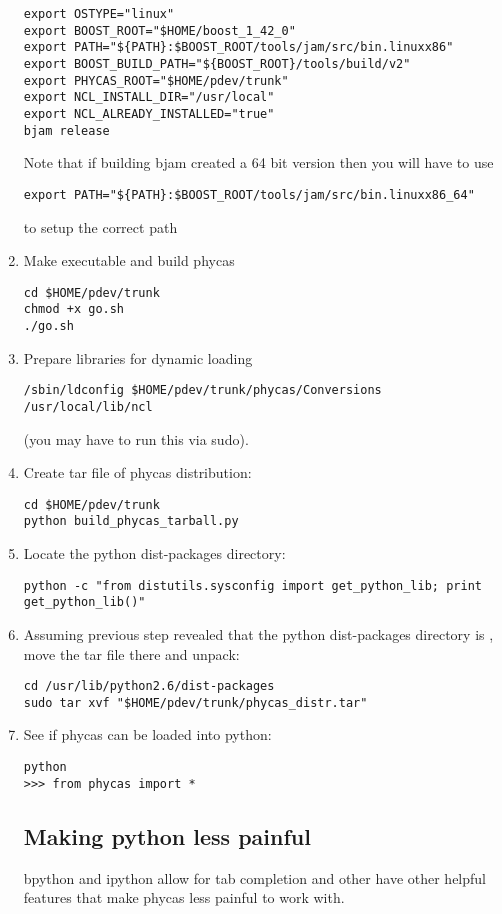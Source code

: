 \begin{enumerate}
\begin{verbatim}
export OSTYPE="linux"
export BOOST_ROOT="$HOME/boost_1_42_0"
export PATH="${PATH}:$BOOST_ROOT/tools/jam/src/bin.linuxx86"
export BOOST_BUILD_PATH="${BOOST_ROOT}/tools/build/v2"
export PHYCAS_ROOT="$HOME/pdev/trunk"
export NCL_INSTALL_DIR="/usr/local"
export NCL_ALREADY_INSTALLED="true"
bjam release
\end{verbatim}

Note that if building bjam created a 64 bit version then you will have to use
\begin{verbatim}
export PATH="${PATH}:$BOOST_ROOT/tools/jam/src/bin.linuxx86_64"
\end{verbatim}
to setup the correct path


%
\item Make  executable and build phycas
\begin{verbatim}
cd $HOME/pdev/trunk
chmod +x go.sh
./go.sh
\end{verbatim}
%
\item Prepare libraries for dynamic loading
\begin{verbatim}
/sbin/ldconfig $HOME/pdev/trunk/phycas/Conversions /usr/local/lib/ncl
\end{verbatim}
(you may have to run this via sudo).
%
\item Create tar file of phycas distribution:
\begin{verbatim}
cd $HOME/pdev/trunk
python build_phycas_tarball.py
\end{verbatim}
%
\item Locate the python dist-packages directory:
\begin{verbatim}
python -c "from distutils.sysconfig import get_python_lib; print get_python_lib()"
\end{verbatim}
%
\item Assuming previous step revealed that the python dist-packages directory is , move the tar file there and unpack:
\begin{verbatim}
cd /usr/lib/python2.6/dist-packages
sudo tar xvf "$HOME/pdev/trunk/phycas_distr.tar"
\end{verbatim}
%
\item See if phycas can be loaded into python:
\begin{verbatim}
python
>>> from phycas import *
\end{verbatim}

\subsection*{Making python less painful}
bpython and ipython allow for tab completion and other have other helpful features that make phycas less painful to work with.


\end{enumerate}
